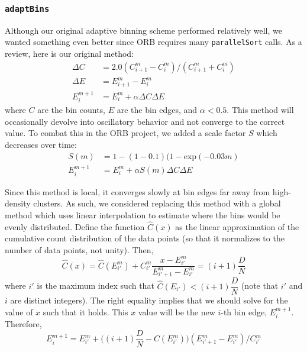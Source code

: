 \documentclass{article}
\begin{document}
\subsubsection{\texttt{adaptBins}}
Although our original adaptive binning scheme performed relatively well, we wanted something even better since ORB requires many \texttt{parallelSort} calls. As a review, here is our original method:
\begin{equation}
	\begin{split}
		\Delta C & = 2.0 ( C^{m}_{i+1} - C^{m}_i ) / ( C^{m}_{i+1} + C^{m}_i ) \\
		\Delta E & = E^m_{i+1} - E^m_i \\
		E^{m+1}_i & = E^m_i + \alpha \Delta C \Delta E
	\end{split}
\end{equation}
where $C$ are the bin counts, $E$ are the bin edges, and $\alpha < 0.5$. This method will occasionally devolve into oscillatory behavior and not converge to the correct value. To combat this in the ORB project, we added a scale factor $S$ which decreases over time:
\begin{equation}
	\begin{split}
		S(m) & = 1 - (1 - 0.1) (1 - \textrm{exp}(-0.03 m) \\
		E^{m+1}_i & = E^m_i + \alpha S(m) \Delta C \Delta E
	\end{split}
\end{equation}

Since this method is local, it converges slowly at bin edges far away from high-density clusters. As such, we considered replacing this method with a global method which uses linear interpolation to estimate where the bins would be evenly distributed. Define the function $\hat C(x)$ as the linear approximation of the cumulative count distribution of the data points (so that it normalizes to the number of data points, not unity). Then,
\begin{equation}
		\hat C(x) = \hat C(E^m_{i'}) + C^m_{i'} \dfrac{x - E^m_{i'}}{E^m_{{i'}+1} - E^m_{i'}} = (i+1) \dfrac{D}{N}
\end{equation}
where $i'$ is the maximum index such that $\hat C(E_{i'}) < (i+1) \dfrac{D}{N}$ (note that $i'$ and $i$ are distinct integers). The right equality implies that we should solve for the value of $x$ such that it holds. This $x$ value will be the new $i$-th bin edge, $E^{m+1}_i$. Therefore,
\begin{equation}
		E^{m+1}_i = E^m_{i'} + \Big( (i+1) \dfrac{D}{N} - C(E^m_{i'}) \Big) (E^m_{{i'}+1} - E^m_{i'}) / C^m_{i'}
\end{equation}
\end{document}

